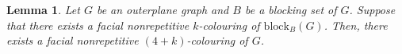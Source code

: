 \documentclass{patmorin}
\newcommand{\block}{\mathrm{block}}
\newtheorem{lemma}[theorem]{Lemma}
\begin{document}
%  
%        
%      
%	
%	
%  
%  
%

\begin{lemma}
  Let $G$ be an outerplane graph and $B$ be a blocking set of
  $G$. Suppose that there exists a facial nonrepetitive $k$-colouring
  of $\block_{B}(G)$. Then, there exists a facial nonrepetitive
  $(4+k)$-colouring of $G$.
 \label{lem:hitting_plus_four}
\end{lemma}

 
\end{document}

